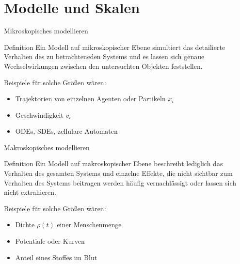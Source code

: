 \documentclass[xcolor=dvipsnames, aspectratio=169]{beamer}
\begin{document}
%	
\section{Modelle und Skalen}

\begin{frame}[t]{Mikroskopisches modellieren}

\begin{exampleblock}{Definition}
    Ein Modell auf mikroskopischer Ebene simultiert das detailierte Verhalten des zu betrachteneden Systems und es lassen sich genaue Wechselwirkungen zwischen den untersuchten Objekten feststellen. 
\end{exampleblock}
\pause
Beispiele für solche Größen wären: 
\vspace{5mm}
\begin{itemize}
\setlength\itemsep{1em}
    \item<2-> Trajektorien von einzelnen Agenten oder Partikeln $x_i$
    \item<3-> Geschwindigkeit $v_i$
    \item<4-> ODEs, SDEs, zellulare Automaten
\end{itemize}
\end{frame}

\begin{frame}[t]{Makroskopisches modellieren}
\begin{exampleblock}{Definition}
    Ein Modell auf makroskopischer Ebene beschreibt lediglich das Verhalten des gesamten Systems und einzelne Effekte, die nicht sichtbar zum Verhalten des Systems beitragen werden häufig vernachlässigt oder lassen sich nicht extrahieren. 
\end{exampleblock}
\pause
Beispiele für solche Größen wären: 
\vspace{5mm}
\begin{itemize}
\setlength\itemsep{1em}
    \item<2-> Dichte $\rho(t)$ einer Menschenmenge
    \item<3-> Potentiale oder Kurven
    \item<4-> Anteil eines Stoffes im Blut
\end{itemize}
\end{frame}
\end{document}
